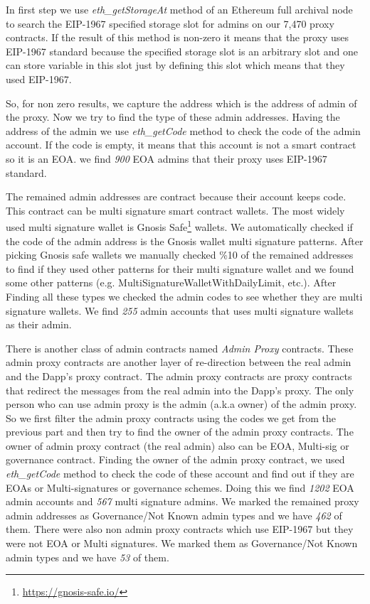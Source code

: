 In first step we use \textit{eth\_getStorageAt} method of an Ethereum full archival node to search the EIP-1967 specified storage slot for admins on our 7,470 proxy contracts. If the result of this method is non-zero it means that the proxy uses EIP-1967 standard because the specified storage slot is an arbitrary slot and one can store variable in this slot just by defining this slot which means that they used EIP-1967.

So, for non zero results, we capture the address which is the address of admin of the proxy. Now we try to find the type of these admin addresses. Having the address of the admin we use \textit{eth\_getCode} method to check the code of the admin account. If the code is empty, it means that this account is not a smart contract so it is an EOA. we find \textit{900} EOA admins that their proxy uses EIP-1967 standard.

The remained admin addresses are contract because their account keeps code. This contract can be multi signature smart contract wallets. The most widely used multi signature wallet is Gnosis Safe\footnote{\url{https://gnosis-safe.io/}} wallets. We automatically checked if the code of the admin address is the Gnosis wallet multi signature patterns. After picking Gnosis safe wallets we manually checked \%10 of the remained addresses to find if they used other patterns for their multi signature wallet and we found some other patterns (e.g. MultiSignatureWalletWithDailyLimit, etc.). After Finding all these types we checked the admin codes to see whether they are multi signature wallets. We find \textit{255} admin accounts that uses multi signature wallets as their admin.

There is another class of admin contracts named \textit{Admin Proxy} contracts. These admin proxy contracts are another layer of re-direction between the real admin and the Dapp's proxy contract. The admin proxy contracts are proxy contracts that redirect the messages from the real admin into the Dapp's proxy. The only person who can use admin proxy is the admin (a.k.a owner) of the admin proxy. So we first filter the admin proxy contracts using the codes we get from the previous part and then try to find the owner of the admin proxy contracts. The owner of admin proxy contract (the real admin) also can be EOA, Multi-sig or governance contract. Finding the owner of the admin proxy contract, we used \textit{eth\_getCode} method to check the code of these account and find out if they are EOAs or Multi-signatures or governance schemes. Doing this we find \textit{1202} EOA admin accounts and \textit{567} multi signature admins. We marked the remained proxy admin addresses as Governance/Not Known admin types and we have \textit{462} of them. There were also non admin proxy contracts which use EIP-1967 but they were not EOA or Multi signatures. We marked them as Governance/Not Known admin types and we have \textit{53} of them.

